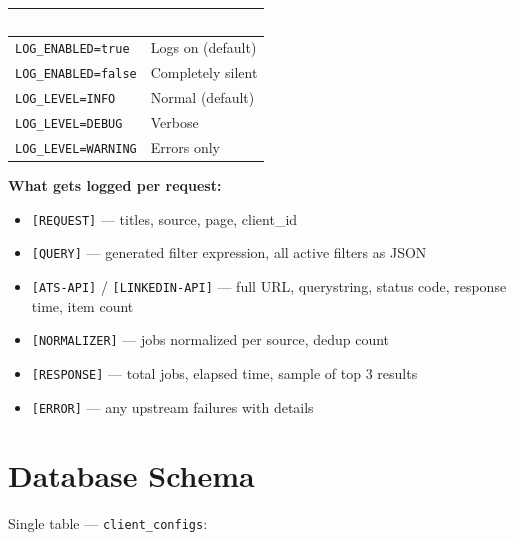 \documentclass[11pt, a4paper]{article}
\begin{document}
\begin{center}\small
\begin{tabularx}{\textwidth}{|L{3cm}|X|}
\hline
{}
\textcolor{white}{\textbf{.env Setting}} & \textcolor{white}{\textbf{Effect}} \\
\hline
\texttt{LOG\_ENABLED=true} & Logs on (default) \\
\texttt{LOG\_ENABLED=false} & Completely silent \\
\texttt{LOG\_LEVEL=INFO} & Normal (default) \\
\texttt{LOG\_LEVEL=DEBUG} & Verbose \\
\texttt{LOG\_LEVEL=WARNING} & Errors only \\
\hline
\end{tabularx}
\end{center}

\textbf{What gets logged per request:}
\begin{itemize}[leftmargin=1.5em, itemsep=1pt]
\small
    \item \texttt{[REQUEST]} --- titles, source, page, client\_id
    \item \texttt{[QUERY]} --- generated filter expression, all active filters as JSON
    \item \texttt{[ATS-API]} / \texttt{[LINKEDIN-API]} --- full URL, querystring, status code, response time, item count
    \item \texttt{[NORMALIZER]} --- jobs normalized per source, dedup count
    \item \texttt{[RESPONSE]} --- total jobs, elapsed time, sample of top 3 results
    \item \texttt{[ERROR]} --- any upstream failures with details
\end{itemize}

\section{Database Schema}

Single table --- \texttt{client\_configs}:
\end{document}
